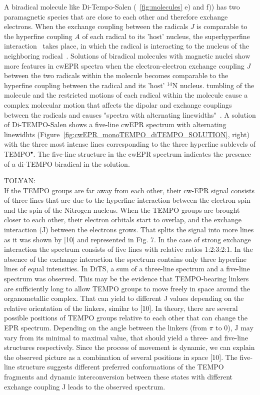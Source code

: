 \par
A biradical molecule like Di-Tempo-Salen (~\ref{fig:molecules} e) and f)) has two paramagnetic species that are close to each other and therefore exchange electrons. When the exchange coupling between the radicals $J$ is comparable to the hyperfine coupling $A$ of each radical to its 'host' nucleus, the superhyperfine interaction~\cite{} takes place, in which the radical is interacting to the nucleus of the neighboring radical~\cite{Eaton2018}. Solutions of biradical molecules with magnetic nuclei show more features in cwEPR spectra when the electron-electron exchange coupling $J$ between the two radicals within the molecule becomes comparable to the hyperfine coupling between the radical and its 'host' $^{14}$N nucleus. tumbling of the molecule and the restricted motions of each radical within the molecule cause a complex molecular motion that affects the dipolar and exchange couplings between the radicals and causes "spectra with alternating linewidths"~\cite{Eaton2018,Carrington_g_factor}. A solution of Di-TEMPO-Salen shows a five-line cwEPR spectrum with alternating linewidhts (Figure~\ref{fig:cwEPR_monoTEMPO_diTEMPO_SOLUTION}, right) with the three most intense lines corresponding to the three hyperfine sublevels of TEMPO$^{\bullet}$. The five-line structure in the cwEPR spectrum indicates the presence of a di-TEMPO biradical in the solution.




\par
TOLYAN:\\
If the TEMPO groups are far away from each other, their cw-EPR signal consists of three
lines that are due to the hyperfine interaction between the electron spin and the spin of the Nitrogen
nucleus. When the TEMPO groups are brought closer to each other, their electron orbitals start to
overlap, and the exchange interaction (J) between the electrons grows. That splits the signal into
more lines as it was shown by [10] and represented in Fig. 7. In the case of strong exchange
interaction the spectrum consists of five lines with relative ratios 1:2:3:2:1. In the absence of the
exchange interaction the spectrum contains only three hyperfine lines of equal intensities.
In DiTS, a sum of a three-line spectrum and a five-line spectrum was observed. This may
be the evidence that TEMPO-bearing linkers are sufficiently long to allow TEMPO groups to move
freely in space around the organometallic complex. That can yield to different J values depending
on the relative orientation of the linkers, similar to [10]. In theory, there are several possible
positions of TEMPO groups relative to each other that can change the EPR spectrum. Depending
on the angle between the linkers (from $\pi$ to 0), J may vary from its minimal to maximal value,
that should yield a three- and five-line structures respectively. Since the process of movement is
dynamic, we can explain the observed picture as a combination of several positions in space [10].
The five-line structure suggests different preferred conformations of the TEMPO fragments and
dynamic interconversion between these states with different exchange coupling J leads to the
observed spectrum.

